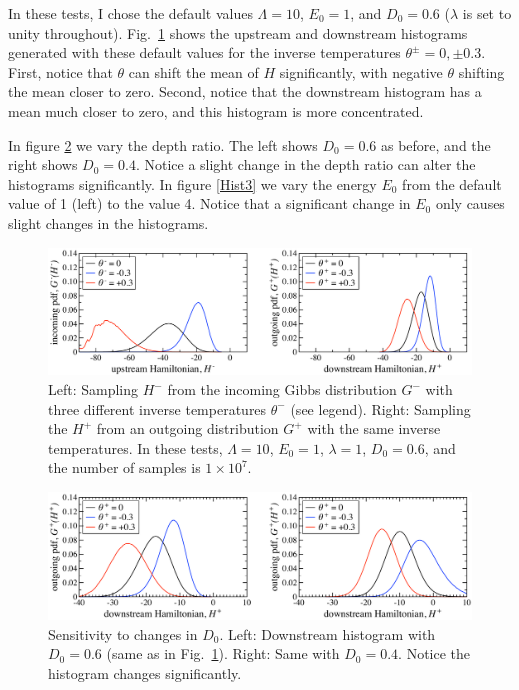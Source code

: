 \documentclass[12pt]{article}
\begin{document}
In these tests, I chose the default values $\Lambda = 10$, $E_0 = 1$, and $D_0 = 0.6$ ($\lambda$ is set to unity throughout). Fig.~\ref{Hist1} shows the upstream and downstream histograms generated with these default values for the inverse temperatures $\theta^{\pm} = 0, \pm 0.3$. First, notice that $\theta$ can shift the mean of $H$ significantly, with negative $\theta$ shifting the mean closer to zero. Second, notice that the downstream histogram has a mean much closer to zero, and this histogram is more concentrated.

In figure \ref{Hist2} we vary the depth ratio. The left shows $D_0 = 0.6$ as before, and the right shows $D_0 = 0.4$. Notice a slight change in the depth ratio can alter the histograms significantly. In figure \ref{Hist3} we vary the energy $E_0$ from the default value of 1 (left) to the value 4. Notice that a significant change in $E_0$ only causes slight changes in the histograms.

\begin{figure}[p]%
\begin{center}
\includegraphics[width = 0.8 \textwidth]{Hist1}
\caption{Left: Sampling $H^-$ from the incoming Gibbs distribution $G^-$ with three different inverse temperatures $\theta^-$ (see legend). Right: Sampling the $H^+$ from an outgoing distribution $G^+$ with the same inverse temperatures.
In these tests, $\Lambda = 10$, $E_0 = 1$, $\lambda = 1$, $D_0 = 0.6$, and the number of samples is $1 \times 10^7$.}
\label{Hist1}
\end{center}
\end{figure}

\begin{figure}[p]%
\begin{center}
\includegraphics[width = 0.8 \textwidth]{Hist2}
\caption{Sensitivity to changes in $D_0$.
Left: Downstream histogram with $D_0 = 0.6$ (same as in Fig.~\ref{Hist1}). Right: Same with $D_0 = 0.4$. Notice the histogram changes significantly.
}
\label{Hist2}
\end{center}
\end{figure}
\end{document}
